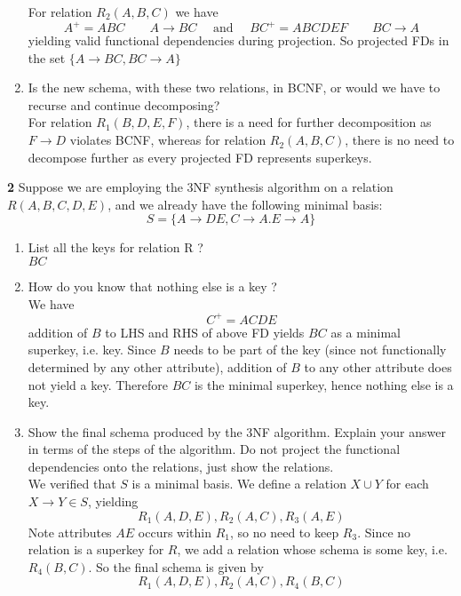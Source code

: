 \documentclass[11pt]{article}
\begin{document}
\begin{solution}
\begin{enumerate}
        For relation $R_2(A,B,C)$ we have
        \[
            A^+ = ABC \quad \quad A \to BC \quad \text{ and } \quad BC^+ = ABCDEF \quad \quad BC \to A
        \]
        yielding valid functional dependencies during projection. So projected FDs in the set $\{ A\to BC, BC \to A \}$
        \item Is the new schema, with these two relations, in BCNF, or would we have to recurse and continue decomposing? \\
        For relation $R_1(B,D,E,F)$, there is a need for further decomposition as $F\to D$ violates BCNF, whereas for relation $R_2(A,B,C)$, there is no need to decompose further as every projected FD represents superkeys.
    \end{enumerate}
\end{solution}


$ $\\
\textbf{2} Suppose we are employing the 3NF synthesis algorithm on a relation $R(A, B, C, D, E)$, and we already have the following minimal basis:
\[
    S = \{A\to DE, C\to A. E\to A \}
\]
\begin{enumerate}
    \item List all the keys for relation R ? \\ 
    $BC$
    \item How do you know that nothing else is a key ?\\
    We have 
    \[
        C^+ = ACDE 
    \]
    addition of $B$ to LHS and RHS of above FD yields $BC$ as a minimal superkey, i.e. key. Since $B$ needs to be part of the key (since not functionally determined by any other attribute), addition of $B$ to any other attribute does not yield a key. Therefore $BC$ is the minimal superkey, hence nothing else is a key.
    \item Show the final schema produced by the 3NF algorithm. Explain your answer in terms of the steps of the algorithm. Do not project the functional dependencies onto the relations, just show the relations.\\
    We verified that $S$ is a minimal basis. We define a relation $X\cup Y$ for each $X\to Y \in S$, yielding 
    \[
        R_1(A,D,E), R_2(A,C), R_3(A,E)
    \]
    Note attributes $AE$ occurs within $R_1$, so no need to keep $R_3$. Since no relation is a superkey for $R$, we add a relation whose schema is some key, i.e. $R_4(B,C)$. So the final schema is given by 
    \[
        R_1(A,D,E), R_2(A,C), R_4(B,C)
    \]
\end{enumerate}
\end{document}
